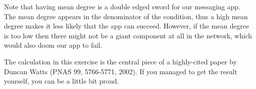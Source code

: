 Note that having mean degree is a double edged sword for our messaging app. The mean degree appears in the denominator of the condition, thus a high mean degree makes it less likely that the app can succeed. However, if the mean degree is too low then there might not be a giant component at all in the network, which would also doom our app to fail. 

The calculation in this exercise is the central piece of a highly-cited paper by Duncan Watts 
(PNAS 99, 5766-5771, 2002). If you managed to get the result yourself, you can be a little bit proud. 
